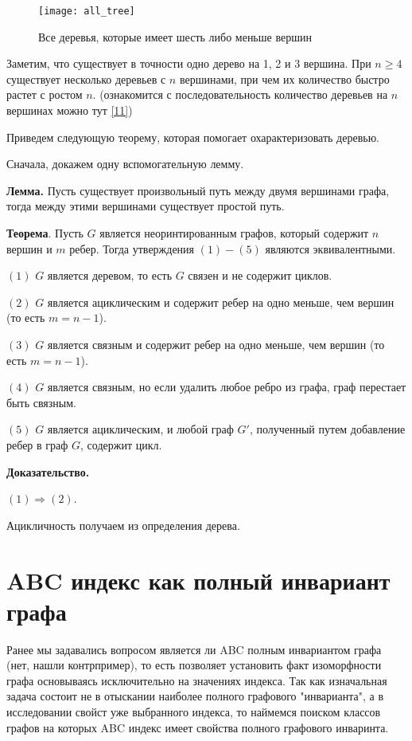 \documentclass{article}
\begin{document}
\begin{figure}[h]
\texttt{[image: all\_tree]}
\centering
\caption{Все деревья, которые имеет шесть либо меньше вершин}
\end{figure}

\newpage

Заметим, что существует в точности одно дерево на 1, 2 и 3 вершина. При $n \geq 4$ существует несколько деревьев с $n$ вершинами, при чем их количество быстро растет с ростом $n$. (ознакомится с последовательность количество деревьев на $n$ вершинах можно тут \hyperlink{count_tree}{[11]})

Приведем следующую теорему, которая помогает охарактеризовать деревью.

Сначала, докажем одну вспомогательную лемму.

\textbf{Лемма.} Пусть существует произвольный путь между двумя вершинами графа, тогда между этими вершинами существует простой путь.



\textbf{Теорема}. Пусть $G$ является неоринтированным графов, который содержит $n$ вершин и $m$ ребер. Тогда утверждения $(1) - (5)$ являются эквивалентными.

$(1)$ $G$ является деревом, то есть $G$ связен и не содержит циклов.

$(2)$ $G$ является ациклическим и содержит ребер на одно меньше, чем вершин (то есть $m = n - 1$).

$(3)$ $G$ является связным и содержит ребер на одно меньше, чем вершин (то есть $m = n - 1$).

$(4)$ $G$ является связным, но если удалить любое ребро из графа, граф перестает быть связным.

$(5)$ $G$ является ациклическим, и любой граф $G'$, полученный путем добавление ребер в граф $G$, содержит цикл.

\textbf{Доказательство.}

$(1) \Rightarrow (2)$.

Ацикличность получаем из определения дерева. 

\newpage  

\section{ABC индекс как полный инвариант графа}

Ранее мы задавались вопросом является ли ABC полным инвариантом графа (нет, нашли контрпример), то есть позволяет установить факт изоморфности графа основываясь исключительно на значениях индекса. Так как изначальная задача состоит не в отыскании наиболее полного графового "инварианта", а в исследовании свойст уже выбранного индекса, то наймемся поиском классов графов на которых ABC индекс имеет свойства полного графового инваринта.
\end{document}
